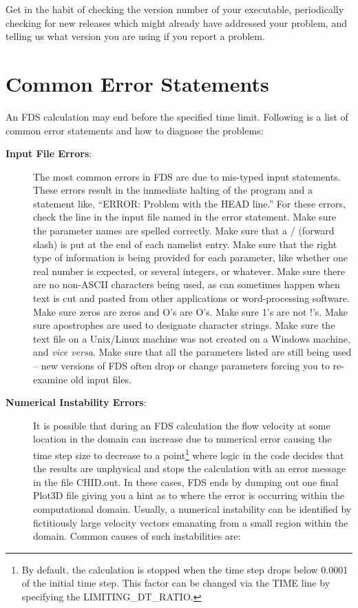 \documentclass[11pt]{book}
\begin{document}
Get in the habit of checking the version number of your executable, periodically checking for new releases which might already have addressed your problem, and telling us what version you are using if you report a problem.





\section{Common Error Statements}
\label{info:Errors}

An FDS calculation may end before the specified time limit. Following is a list of common error statements and how to diagnose the problems:
\begin{description}
\item[{\bf Input File Errors}:] The most common errors in FDS are due to mis-typed input statements. These errors result in the immediate halting of the program and a statement like, ``ERROR: Problem with the HEAD line.'' For these errors, check the line in the input file named in the error statement. Make sure the parameter names are spelled correctly. Make sure that a / (forward slash) is put at the end of each namelist entry. Make sure that the right type of information is being provided for each parameter, like whether one real number is expected, or several integers, or whatever. Make sure there are no non-ASCII characters being used, as can sometimes happen when text is cut and pasted from other applications or word-processing software. Make sure zeros are zeros and O's are O's. Make sure 1's are not !'s. Make sure apostrophes are used to designate character strings. Make sure the text file on a Unix/Linux machine was not created on a Windows machine, and {\em vice versa}. Make sure that all the parameters listed are still being used -- new versions of FDS often drop or change parameters forcing you to re-examine old input files.
\item [{\bf Numerical Instability Errors}:] It is possible that during an FDS calculation the flow velocity at some location in the domain can increase due to numerical error causing the time step size to decrease to a point\footnote{By default, the calculation is stopped when the time step drops below 0.0001 of the initial time step. This factor can be changed via the {\ct TIME} line by specifying the {\ct LIMITING\_DT\_RATIO}.} where logic in the code decides that the results are unphysical and stops the calculation with an error message in the file {\ct CHID.out}. In these cases, FDS ends by dumping out one final Plot3D file giving you a hint as to where the error is occurring within the computational domain. Usually, a numerical instability can be identified by fictitiously large velocity vectors emanating from a small region within the domain. Common causes of such instabilities are:

\end{description}
\end{document}
